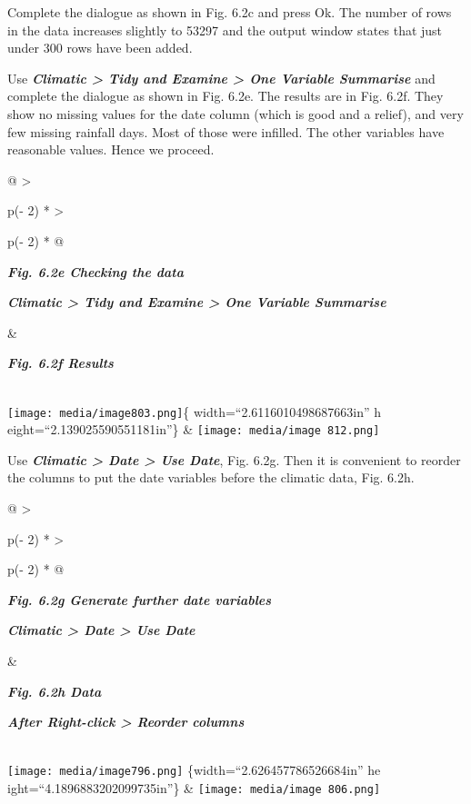 \documentclass[
  letterpaper,
  DIV=11,
  numbers=noendperiod]{scrreprt}
\begin{document}
Complete the dialogue as shown in Fig. 6.2c and press Ok. The number of
rows in the data increases slightly to 53297 and the output window
states that just under 300 rows have been added.

Use \textbf{\emph{Climatic \textgreater{} Tidy and Examine
\textgreater{} One Variable Summarise}} and complete the dialogue as
shown in Fig. 6.2e. The results are in Fig. 6.2f. They show no missing
values for the date column (which is good and a relief), and very few
missing rainfall days. Most of those were infilled. The other variables
have reasonable values. Hence we proceed.

\begin{longtable}[]{@{}
  >{\raggedright\arraybackslash}p{(\columnwidth - 2\tabcolsep) * }
  >{\raggedright\arraybackslash}p{(\columnwidth - 2\tabcolsep) * }@{}}
\toprule\noalign{}
\begin{minipage}[b]{\linewidth}\raggedright
\textbf{\emph{Fig. 6.2e Checking the data}}

\textbf{\emph{Climatic \textgreater{} Tidy and Examine \textgreater{}
One Variable Summarise}}
\end{minipage} & \begin{minipage}[b]{\linewidth}\raggedright
\textbf{\emph{Fig. 6.2f Results}}
\end{minipage} \\
\midrule\noalign{}
\endhead
\bottomrule\noalign{}
\endlastfoot
\texttt{[image: media/image803.png]}\{ width=``2.6116010498687663in'' h
eight=``2.139025590551181in''\} &
\texttt{[image: media/image 812.png]} \\
\end{longtable}

Use \textbf{\emph{Climatic \textgreater{} Date \textgreater{} Use
Date}}, Fig. 6.2g. Then it is convenient to reorder the columns to put
the date variables before the climatic data, Fig. 6.2h.

\begin{longtable}[]{@{}
  >{\raggedright\arraybackslash}p{(\columnwidth - 2\tabcolsep) * }
  >{\raggedright\arraybackslash}p{(\columnwidth - 2\tabcolsep) * }@{}}
\toprule\noalign{}
\begin{minipage}[b]{\linewidth}\raggedright
\textbf{\emph{Fig. 6.2g Generate further date variables}}

\textbf{\emph{Climatic \textgreater{} Date \textgreater{} Use Date}}
\end{minipage} & \begin{minipage}[b]{\linewidth}\raggedright
\textbf{\emph{Fig. 6.2h Data}}

\textbf{\emph{After Right-click \textgreater{} Reorder columns}}
\end{minipage} \\
\midrule\noalign{}
\endhead
\bottomrule\noalign{}
\endlastfoot
\texttt{[image: media/image796.png]} \{width=``2.626457786526684in'' he
ight=``4.1896883202099735in''\} &
\texttt{[image: media/image 806.png]} \\
\end{longtable}
\end{document}
